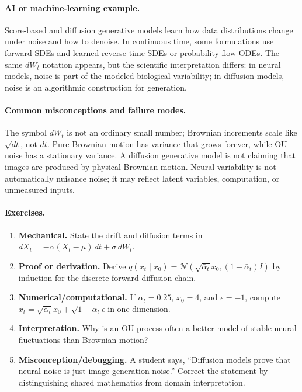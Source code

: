 \paragraph{AI or machine-learning example.}
Score-based and diffusion generative models learn how data distributions change under noise and how to denoise. In continuous time, some formulations use forward SDEs and learned reverse-time SDEs or probability-flow ODEs. The same \(dW_t\) notation appears, but the scientific interpretation differs: in neural models, noise is part of the modeled biological variability; in diffusion models, noise is an algorithmic construction for generation.

\paragraph{Common misconceptions and failure modes.}
The symbol \(dW_t\) is not an ordinary small number; Brownian increments scale like \(\sqrt{dt}\), not \(dt\). Pure Brownian motion has variance that grows forever, while OU noise has a stationary variance. A diffusion generative model is not claiming that images are produced by physical Brownian motion. Neural variability is not automatically nuisance noise; it may reflect latent variables, computation, or unmeasured inputs.

\paragraph{Exercises.}
\begin{enumerate}[label=\textbf{53.4.\arabic*.}, leftmargin=*]
\item \textbf{Mechanical.} State the drift and diffusion terms in \(dX_t=-\alpha(X_t-\mu)\,dt+\sigma\,dW_t\).
\item \textbf{Proof or derivation.} Derive \(q(x_t\mid x_0)=\mathcal N(\sqrt{\bar\alpha_t}x_0,(1-\bar\alpha_t)I)\) by induction for the discrete forward diffusion chain.
\item \textbf{Numerical/computational.} If \(\bar\alpha_t=0.25\), \(x_0=4\), and \(\epsilon=-1\), compute \(x_t=\sqrt{\bar\alpha_t}x_0+\sqrt{1-\bar\alpha_t}\epsilon\) in one dimension.
\item \textbf{Interpretation.} Why is an OU process often a better model of stable neural fluctuations than Brownian motion?
\item \textbf{Misconception/debugging.} A student says, ``Diffusion models prove that neural noise is just image-generation noise.'' Correct the statement by distinguishing shared mathematics from domain interpretation.
\end{enumerate}

